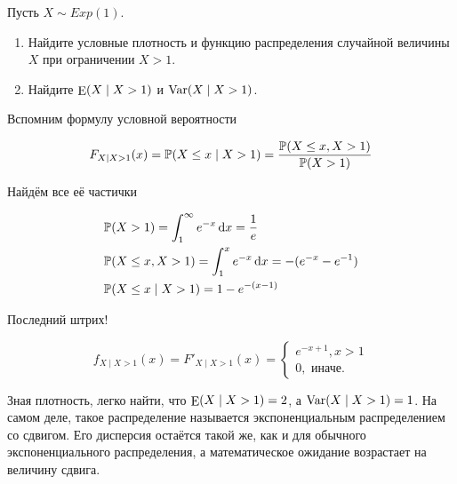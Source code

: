 \begin{problem} 
Пусть $X \sim Exp(1)$. 

\begin{enumerate} 
\item  Найдите условные плотность и функцию распределения случайной величины $X$ при ограничении $X > 1$.
\item  Найдите $\operatorname{\mathop{E}}(X \mid X > 1)$ и  $\operatorname{Var}(X \mid X > 1)$.
\end{enumerate} 
\begin{sol}
	Вспомним формулу условной вероятности
	
	\[ F_{X \mid X > 1} (x) = \mathbb{P}(X \le x \mid X > 1) = \frac{\mathbb{P}(X \le x, X > 1)}{\mathbb{P}(X > 1)}\]
	
Найдём все её частички

\begin{equation*}
\begin{aligned}
& \mathbb{P}(X > 1) = \int_1^{\infty} e^{-x} \,\mathrm{d}x = \frac{1}{e} \\ 
& \mathbb{P}(X \le x, X >1) = \int_1^x e^{-x} \,\mathrm{d}x = -(e^{-x} - e^{-1}) \\
& \mathbb{P}(X \le x \mid X > 1) = 1 - e^{-(x - 1)} \\
\end{aligned}
\end{equation*}

Последний штрих! 

\[ f_{X \mid X > 1} (x) =  F'_{X \mid X > 1} (x) = \begin{cases} e^{-x + 1}, x > 1 \\ 0, \text{  иначе.} \end{cases} \]

Зная плотность, легко найти, что $\operatorname{\mathop{E}}(X \mid X >1) = 2$, а $\operatorname{Var}(X \mid X > 1) = 1$.  На самом деле, такое распределение называется экспоненциальным распределением со сдвигом. Его дисперсия остаётся такой же, как и для обычного экспоненциального распределения, а математическое ожидание возрастает на величину сдвига. 
\end{sol} 
\end{problem}


